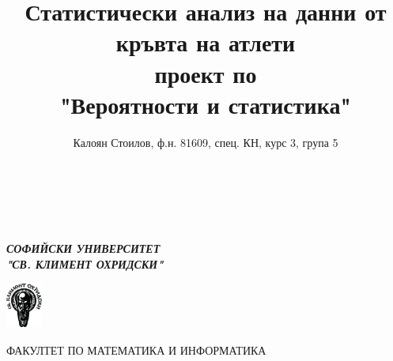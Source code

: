\documentclass[12pt]{article} %
\title{
  \Huge \textbf{Статистически анализ на данни от кръвта на атлети} \\
  \vspace{0.5cm}
  \Large проект по \\ "Вероятности и статистика"
}
\author{Калоян Стоилов, ф.н. 81609, спец. КН, курс 3, група 5}
\date{\formatdate{11}{5}{2020}}
\begin{document}
\makeatletter
\begin{titlepage}
  \begin{center}
    {\bfseries  \@title}\\[4ex]
    {\LARGE \@author}\\[50ex]
    {\large \@date}\\[4ex]
    \textbf{\textit{СОФИЙСКИ УНИВЕРСИТЕТ \\ "СВ. КЛИМЕНТ ОХРИДСКИ"}}
    \begin{center}
      \includegraphics[width=1.2cm,height=1.5cm]{logo_su_s_nadpis_imagelarge}
    \end{center}
        ФАКУЛТЕТ ПО МАТЕМАТИКА И ИНФОРМАТИКА
        \end{center}
\end{titlepage}
\makeatother
\thispagestyle{empty}
\newpage
\end{document}
